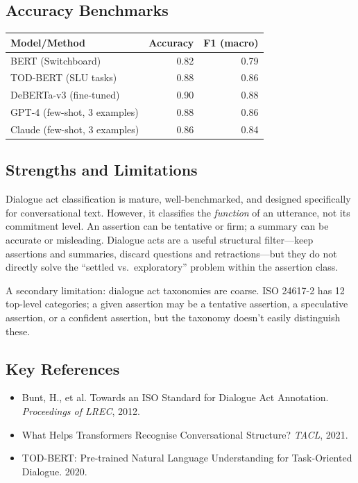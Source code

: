 \documentclass[11pt,letterpaper]{article}
\begin{document}
\subsection{Accuracy Benchmarks}

\begin{center}
\begin{tabular}{lrr}
  \toprule
  \textbf{Model/Method} & \textbf{Accuracy} & \textbf{F1 (macro)} \\
  \midrule
  BERT (Switchboard) & 0.82 & 0.79 \\
  TOD-BERT (SLU tasks) & 0.88 & 0.86 \\
  DeBERTa-v3 (fine-tuned) & 0.90 & 0.88 \\
  GPT-4 (few-shot, 3 examples) & 0.88 & 0.86 \\
  Claude (few-shot, 3 examples) & 0.86 & 0.84 \\
  \bottomrule
\end{tabular}
\end{center}

\subsection{Strengths and Limitations}

Dialogue act classification is mature, well-benchmarked, and designed specifically for conversational text. However, it classifies the \textit{function} of an utterance, not its commitment level. An assertion can be tentative or firm; a summary can be accurate or misleading. Dialogue acts are a useful structural filter—keep assertions and summaries, discard questions and retractions—but they do not directly solve the ``settled vs.\ exploratory'' problem within the assertion class.

A secondary limitation: dialogue act taxonomies are coarse. ISO 24617-2 has 12 top-level categories; a given assertion may be a tentative assertion, a speculative assertion, or a confident assertion, but the taxonomy doesn't easily distinguish these.

\subsection{Key References}

\begin{itemize}
  \item Bunt, H., et al. Towards an ISO Standard for Dialogue Act Annotation. \textit{Proceedings of LREC}, 2012.
  \item What Helps Transformers Recognise Conversational Structure? \textit{TACL}, 2021.
  \item TOD-BERT: Pre-trained Natural Language Understanding for Task-Oriented Dialogue. 2020.
\end{itemize}
\end{document}
